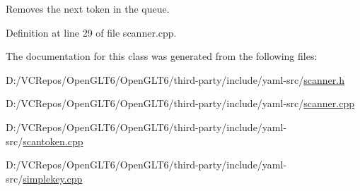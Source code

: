 Removes the next token in the queue. 

Definition at line 29 of file scanner.\+cpp.



The documentation for this class was generated from the following files\+:\begin{DoxyCompactItemize}
\item 
D\+:/\+V\+C\+Repos/\+Open\+G\+L\+T6/\+Open\+G\+L\+T6/third-\/party/include/yaml-\/src/\mbox{\hyperlink{scanner_8h}{scanner.\+h}}\item 
D\+:/\+V\+C\+Repos/\+Open\+G\+L\+T6/\+Open\+G\+L\+T6/third-\/party/include/yaml-\/src/\mbox{\hyperlink{scanner_8cpp}{scanner.\+cpp}}\item 
D\+:/\+V\+C\+Repos/\+Open\+G\+L\+T6/\+Open\+G\+L\+T6/third-\/party/include/yaml-\/src/\mbox{\hyperlink{scantoken_8cpp}{scantoken.\+cpp}}\item 
D\+:/\+V\+C\+Repos/\+Open\+G\+L\+T6/\+Open\+G\+L\+T6/third-\/party/include/yaml-\/src/\mbox{\hyperlink{simplekey_8cpp}{simplekey.\+cpp}}\end{DoxyCompactItemize}
